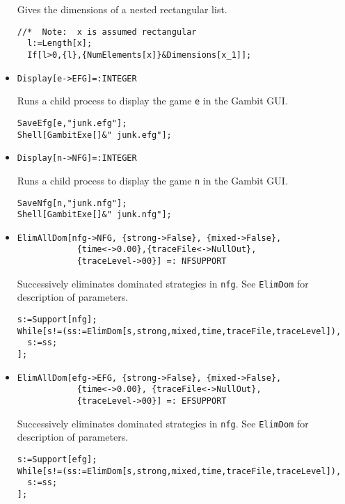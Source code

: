 \begin{itemize}
\bd 
Gives the dimensions of a nested rectangular list. 
\begin{verbatim}
//*  Note:  x is assumed rectangular
  l:=Length[x];
  If[l>0,{l},{NumElements[x]}&Dimensions[x_1]];
\end{verbatim} 
\ed


\item{}
\protect \large \begin{verbatim}
Display[e->EFG]=:INTEGER
\end{verbatim}\normalsize

\bd 
Runs a child process to display the game \verb+e+ in the Gambit GUI. 
\begin{verbatim}
SaveEfg[e,"junk.efg"];
Shell[GambitExe[]&" junk.efg"];
\end{verbatim} 
\ed

\item{}
\protect \large \begin{verbatim}
Display[n->NFG]=:INTEGER
\end{verbatim}\normalsize

\bd 
Runs a child process to display the game \verb+n+ in the Gambit GUI. 
\begin{verbatim}
SaveNfg[n,"junk.nfg"];
Shell[GambitExe[]&" junk.nfg"];
\end{verbatim} 
\ed

\item{}
\protect \large \begin{verbatim}
ElimAllDom[nfg->NFG, {strong->False}, {mixed->False},
            {time<->0.00},{traceFile<->NullOut}, 
            {traceLevel->00}] =: NFSUPPORT
\end{verbatim}\normalsize

\bd 
Successively eliminates dominated strategies in \verb+nfg+.  See
\verb+ElimDom+ for description of parameters.  
\begin{verbatim}
s:=Support[nfg];
While[s!=(ss:=ElimDom[s,strong,mixed,time,traceFile,traceLevel]),
  s:=ss;
];
\end{verbatim} 
\ed

\item{}
\protect \large \begin{verbatim}
ElimAllDom[efg->EFG, {strong->False}, {mixed->False},
            {time<->0.00}, {traceFile<->NullOut}, 
            {traceLevel->00}] =: EFSUPPORT
\end{verbatim}\normalsize

\bd 
Successively eliminates dominated strategies in \verb+nfg+. See
\verb+ElimDom+ for description of parameters.  
\begin{verbatim}
s:=Support[efg];
While[s!=(ss:=ElimDom[s,strong,mixed,time,traceFile,traceLevel]),
  s:=ss;
];
\end{verbatim} 
\ed


\end{itemize}
